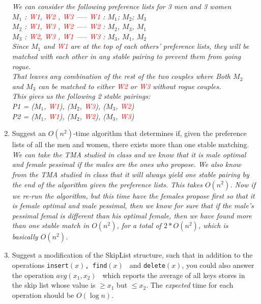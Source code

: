 \documentclass[11pt,epic,leqno,eepic,psfig,]{article}
\newcommand{\ans}[1]{{\color{brown}{\bf\Large Answer:} \sl  #1 \color{black}}}
\renewcommand{\i}{\item}
\begin{document}
\begin{enumerate}
\ans{We can consider the following preference lists for 3 men and 3 women
\\$M_1$ : \textcolor{red}{W1}, \textcolor{red}{W2} , \textcolor{red}{W3}  -----  \textcolor{red}{W1} : $M_1$; $M_2$; $M_3$
\\$M_2$ : \textcolor{red}{W1}, \textcolor{red}{W3} , \textcolor{red}{W2}  -----  \textcolor{red}{W2}  : $M_2$, $M_3$, $M_1$
\\$M_3$ : \textcolor{red}{W2}, \textcolor{red}{W3} , \textcolor{red}{W1}  -----  \textcolor{red}{W3}  : $M_3$, $M_1$, $M_2$
\\Since $M_1$ and  \textcolor{red}{W1}  are at the top of each others' preference lists, they will be matched with each other in any stable pairing to prevent them from going rogue.
\\That leaves any combination of the rest of the two couples where Both $M_2$ and $M_3$ can be matched to either \textcolor{red}{W2} or \textcolor{red}{W3} without rogue couples.
\\ This gives us the following 2 stable pairings:
\\ P1 = ($M_1$, \textcolor{red}{W1}), ($M_2$, \textcolor{red}{W3}), ($M_3$, \textcolor{red}{W2})
\\ P2 = ($M_1$, \textcolor{red}{W1}), ($M_2$, \textcolor{red}{W2}), ($M_3$, \textcolor{red}{W3})}

 \i Suggest an $O(n^2)$-time algorithm that determines if, given the preference lists of all the men and women, there exists more than one stable matching.
\\\ans{We can take the TMA studied in class and we know that it is male optimal and female pessimal if the males are the ones who propose. We also know from the TMA studied in class that it will always yield one stable pairing by the end of the algorithm given the preference lists. This takes $O(n^2)$. Now if we re-run the algorithm, but this time have the females propose first so that it is female optimal and male pessimal, then we know for sure that if the male's pessimal femal is different than his optimal female, then we have found more than one stable match in $O(n^2)$, for a total of $2 * O(n^2)$, which is basically $O(n^2)$.}

  \i Suggest a modification of the SkipList structure, such that in addition to the operations
 { \tt insert$(x)$, find$(x)$ } and {\tt delete$(x)$}, you could also answer the operation {\tt $avg(x_1, x_2)$ } which reports the average of all keys stores in the skip list whose value is $\geq x_1$ but $\leq x_2$.
 The {\em expected}  time for each operation should be $O(\log n)$.



\end{enumerate}
\end{document}
